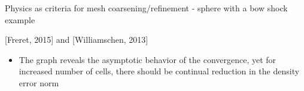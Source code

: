 \documentclass{beamer}
\begin{document}
\begin{frame}
\begin{minipage}[t][1\textheight]{1\textwidth}
\begin{exampleblock}{Physics as criteria for mesh coarsening/refinement - sphere with a bow shock example}
\begin{figure}
\end{figure}

[Freret, 2015] and [Williamschen, 2013]
\begin{itemize}
\item The graph reveals the asymptotic behavior of the convergence, yet for increased number of cells, there should be continual reduction in the density error norm
\end{itemize}
\end{exampleblock}
\end{minipage}

\end{frame}
\end{document}
